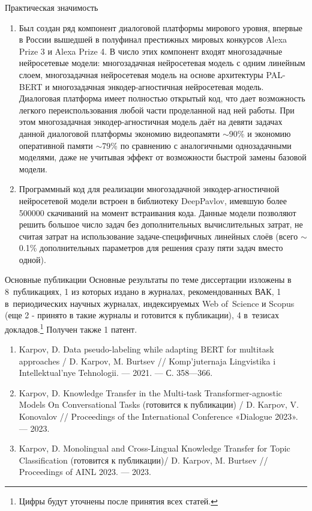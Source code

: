 \begin{frame}{Практическая значимость}
\begin{enumerate}
   \item Был создан ряд компонент диалоговой платформы мирового уровня, впервые в России вышедшей в полуфинал престижных мировых конкурсов Alexa Prize 3 и Alexa Prize 4. В число этих компонент входят многозадачные нейросетевые модели: многозадачная нейросетевая модель с одним линейным слоем, многозадачная нейросетевая модель на основе архитектуры PAL-BERT и многозадачная энкодер-агностичная нейросетевая модель. Диалоговая платформа имеет полностью открытый код, что дает возможность легкого переиспользования любой части проделанной над ней работы. При этом многозадачная энкодер-агностичная модель даёт на девяти задачах данной диалоговой платформы экономию видеопамяти $\sim$90\% и экономию оперативной памяти $\sim$79\% по сравнению с аналогичными однозадачными моделями, даже не учитывая эффект от возможности быстрой замены базовой модели.
   \item Программный код для реализации многозадачной энкодер-агностичной нейросетевой модели встроен в библиотеку DeepPavlov, имевшую более 500000 скачиваний на момент встраивания кода. Данные модели позволяют решить большое число задач без дополнительных вычислительных затрат, не считая затрат на использование задаче-специфичных линейных слоёв (всего $\sim$0.1\% дополнительных параметров для решения сразу пяти задач вместо одной).
\end{enumerate}    
\end{frame}

\begin{frame}{Основные публикации}
 Основные результаты по теме диссертации изложены в 8~публикациях, {1} из которых издано в журналах, рекомендованных ВАК, {1} в~периодических научных журналах, индексируемых Web of~Science и Scopus (еще 2 - принято в такие журналы и готовится к публикации), {4} в~тезисах докладов.\footnote{Цифры будут уточнены после принятия всех статей.} Получен также 1 патент.
 \newline
\begin{enumerate}
 \item Karpov, D. Data pseudo-labeling while adapting BERT for multitask
approaches  / D. Karpov, M. Burtsev // Komp’juternaja
Lingvistika i Intellektual’nye Tehnologii. — 2021. — С. 358—366.
\item  Karpov, D. Knowledge Transfer in the Multi-task Transformer-agnostic
Models On Conversational Tasks (готовится к публикации) /
D. Karpov, V. Konovalov // Proceedings of the International Conference
«Dialogue 2023». — 2023.
\item Karpov, D. Monolingual and Cross-Lingual Knowledge Transfer for
Topic Classification (готовится к публикации)/ D. Karpov,
M. Burtsev // Proceedings of AINL 2023. — 2023.
\end{enumerate}
\end{frame}

